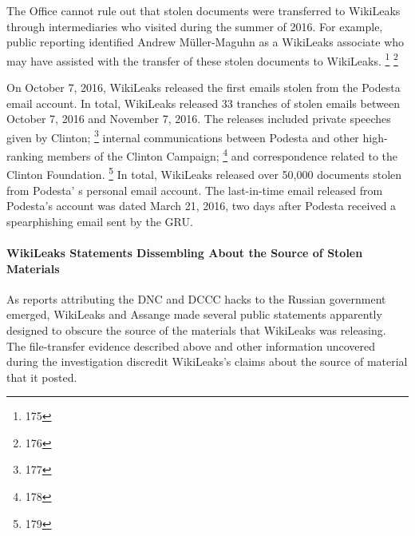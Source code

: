 The Office cannot rule out that stolen documents were transferred to WikiLeaks through intermediaries who visited during the summer of 2016.
For example, public reporting identified Andrew Müller-Maguhn as a WikiLeaks associate who may have assisted with the transfer of these stolen documents to WikiLeaks.%
\footnote{175}
\footnote{176}

On October 7, 2016, WikiLeaks released the first emails stolen from the Podesta email account.
In total, WikiLeaks released 33 tranches of stolen emails between October 7, 2016 and November 7, 2016.
The releases included private speeches given by Clinton;%
\footnote{177}
internal communications between Podesta and other high-ranking members of the Clinton Campaign;%
\footnote{178}
and correspondence related to the Clinton Foundation.%
\footnote{179}
In total, WikiLeaks released over 50,000 documents stolen from Podesta' s  personal email account.
The last-in-time email released from Podesta's account was dated March 21, 2016, two days after Podesta received a spearphishing email sent by the GRU.

\paragraph{WikiLeaks Statements Dissembling About the Source of Stolen Materials}

As reports attributing the DNC and DCCC hacks to the Russian government emerged, WikiLeaks and Assange made several public statements apparently designed to obscure the source of the materials that WikiLeaks was  releasing.
The file-transfer evidence described above and other information uncovered during the investigation discredit WikiLeaks's claims about the source of material that it posted.

